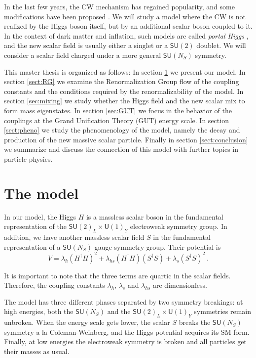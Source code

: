 \documentclass[aps,prd,preprintnumbers,nofootinbibn,twocolumn]{revtex4}
\begin{document}
In the last few years, the CW mechanism has regained popularity, and some modifications have been proposed \cite{Dermisek:2013pta, Hill:2014mqa, Antipin:2015kgh}. We will study a model where the CW is not realized by the Higgs boson itself, but by an additional scalar boson coupled to it. In the context of dark matter and inflation, such models are called \textit{portal Higgs} \cite{Patt:2006fw, Englert:2013gz}, and the new scalar field is usually either a singlet or a $\mathsf{SU}(2)$ doublet. We will consider a scalar field charged under a more general $\mathsf{SU}(N_S)$ symmetry.

This master thesis is organized as follows: In section \ref{sect:model} we present our model. In section \ref{sect:RG} we examine the Renormalization Group flow of the coupling constants and the conditions required by the renormalizability of the model. In section \ref{sec:mixing} we study whether the Higgs field and the new scalar mix to form mass eigenstates. In section \ref{sec:GUT} we focus in the behavior of the couplings at the Grand Unification Theory (GUT) energy scale. In section \ref{sect:pheno} we study the phenomenology of the model, namely the decay and production of the new massive scalar particle. Finally in section \ref{sect:conclusion} we summarize and discuss the connection of this model with further topics in particle physics.

\section{The model} \label{sect:model}
In our model, the Higgs $H$ is a massless scalar boson in the fundamental representation of the $\mathsf{SU}(2)_L \times \mathsf{U}(1)_Y$ electroweak symmetry group. In addition, we have another massless scalar field $S$ in the fundamental representation of a $\mathsf{SU}(N_S)$ gauge symmetry group. Their potential is
\begin{equation}\label{eq:CWpotential}
V = \lambda_h (H^\dagger H)^2 + \lambda_{hs} (H^\dagger H) (S^\dagger S) + \lambda_s (S^\dagger S)^2\ .
\end{equation}

It is important to note that the three terms are quartic in the scalar fields. Therefore, the coupling constants $\lambda_h$, $\lambda_s$ and $\lambda_{hs}$ are dimensionless.

The model has three different phases separated by two symmetry breakings: at high energies, both the $\mathsf{SU}(N_S)$ and the  $\mathsf{SU}(2)_L \times \mathsf{U}(1)_Y$ symmetries remain unbroken. When the energy scale gets lower, the scalar $S$ breaks the $\mathsf{SU}(N_S)$ symmetry a la Coleman-Weinberg, and the Higgs potential acquires its SM form. Finally, at low energies the electroweak symmetry is broken and all particles get their masses as usual.
\end{document}

